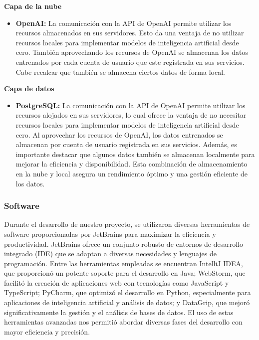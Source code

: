 \textbf{Capa de la nube}

\begin{itemize}
	\item \textbf{OpenAI:} La comunicación con la API de OpenAI permite utilizar los recursos almacenados en sus servidores. Esto da una ventaja de no utilizar recursos locales para implementar modelos de inteligencia artificial desde cero. También aprovechando los recursos de OpenAI se almacenan los datos entrenados por cada cuenta de usuario que este registrada en sus servicios. Cabe recalcar que también se almacena ciertos datos de forma local. 
\end{itemize}

\textbf{Capa de datos}

\begin{itemize}
	\item \textbf{PostgreSQL:} La comunicación con la API de OpenAI permite utilizar los recursos alojados en sus servidores, lo cual ofrece la ventaja de no necesitar recursos locales para implementar modelos de inteligencia artificial desde cero. Al aprovechar los recursos de OpenAI, los datos entrenados se almacenan por cuenta de usuario registrada en sus servicios. Además, es importante destacar que algunos datos también se almacenan localmente para mejorar la eficiencia y disponibilidad. Esta combinación de almacenamiento en la nube y local asegura un rendimiento óptimo y una gestión eficiente de los datos.
\end{itemize}


\subsubsection{Software}

Durante el desarrollo de nuestro proyecto, se utilizaron diversas herramientas de software proporcionadas por JetBrains para maximizar la eficiencia y productividad. JetBrains ofrece un conjunto robusto de entornos de desarrollo integrado (IDE) que se adaptan a diversas necesidades y lenguajes de programación. Entre las herramientas empleadas se encuentran IntelliJ IDEA, que proporcionó un potente soporte para el desarrollo en Java; WebStorm, que facilitó la creación de aplicaciones web con tecnologías como JavaScript y TypeScript; PyCharm, que optimizó el desarrollo en Python, especialmente para aplicaciones de inteligencia artificial y análisis de datos; y DataGrip, que mejoró significativamente la gestión y el análisis de bases de datos. El uso de estas herramientas avanzadas nos permitió abordar diversas fases del desarrollo con mayor eficiencia y precisión.

